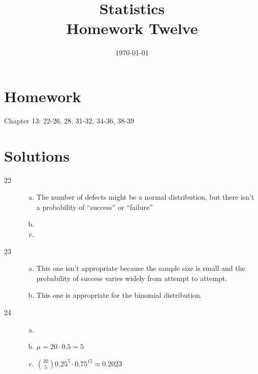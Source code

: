 \documentclass[letterpaper, landscape]{exam}
\title{Statistics \\ Homework Twelve}
\date{\today}
\author{}
\begin{document}
  \maketitle

  \section{Homework}

  Chapter 13: 22-26, 28, 31-32, 34-36, 38-39

  \ifprintanswers
    \section{Solutions}
    \begin{description}

      \item[22] 
        \begin{enumerate}[(a)]
          \item {}
            The number of defects might be a normal distribution, but there
            isn't a probability of ``success'' or ``failure''

          \item {}

          \item {}
        \end{enumerate}

      \item[23]
        \begin{enumerate}[(a)]
          \item This one isn't appropriate because the sample size is small and
            the probability of success varies widely from attempt to attempt.

          \item This one is appropriate for the binomial distribution.
        \end{enumerate}

      \item[24]
        \begin{enumerate}[(a)]
          \item {}

          \item $\mu = 20 \cdot 0.5 = \boxed{ 5 }$

          \item $ \binom{20}{5} 0.25^5 \cdot 0.75^{15} \approx \boxed{ 0.2023 } $
        \end{enumerate}


\end{description}
\end{document}
